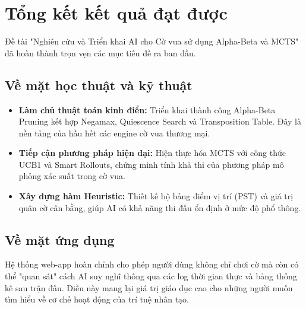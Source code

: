 \section{Tổng kết kết quả đạt được}

Đề tài "Nghiên cứu và Triển khai AI cho Cờ vua sử dụng Alpha-Beta và MCTS" đã hoàn thành trọn vẹn các mục tiêu đề ra ban đầu. 

\subsection{Về mặt học thuật và kỹ thuật}
\begin{itemize}
    \item \textbf{Làm chủ thuật toán kinh điển:} Triển khai thành công Alpha-Beta Pruning kết hợp Negamax, Quiescence Search và Transposition Table. Đây là nền tảng của hầu hết các engine cờ vua thương mại.
    \item \textbf{Tiếp cận phương pháp hiện đại:} Hiện thực hóa MCTS với công thức UCB1 và Smart Rollouts, chứng minh tính khả thi của phương pháp mô phỏng xác suất trong cờ vua.
    \item \textbf{Xây dựng hàm Heuristic:} Thiết kế bộ bảng điểm vị trí (PST) và giá trị quân cờ cân bằng, giúp AI có khả năng thi đấu ổn định ở mức độ phổ thông.
\end{itemize}

\subsection{Về mặt ứng dụng}
Hệ thống web-app hoàn chỉnh cho phép người dùng không chỉ chơi cờ mà còn có thể "quan sát" cách AI suy nghĩ thông qua các log thời gian thực và bảng thống kê sau trận đấu. Điều này mang lại giá trị giáo dục cao cho những người muốn tìm hiểu về cơ chế hoạt động của trí tuệ nhân tạo.
